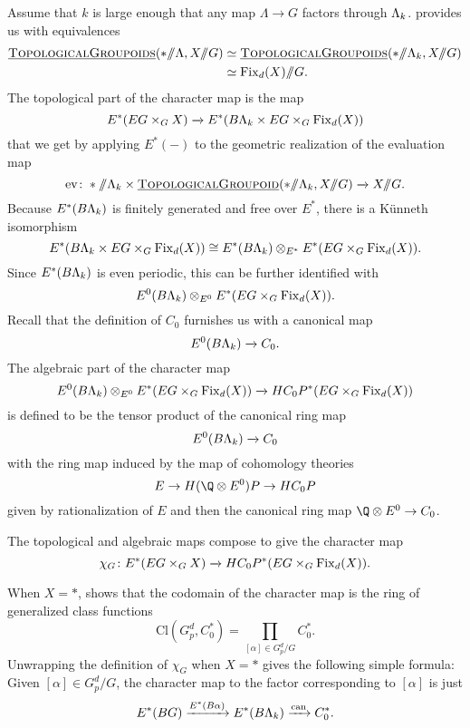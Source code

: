 Assume that $k$ is large enough that any map $\Lambda \rightarrow G$ factors through $\Lambda_k$.   provides us with equivalences
\begin{align*}
\InternalHom{TopologicalGroupoids}(* \mmod \Lambda, X \mmod G) & \simeq \InternalHom{TopologicalGroupoids}(* \mmod \Lk, X \mmod G) \\
& \simeq \Fix_d(X)\mmod G.
\end{align*}
The topological part of the character map is the map
\[
E^*(EG \times_G X) \xrightarrow{} E^*(B\Lambda_k \times EG\times_G \operatorname{Fix}_d(X))
\]
that we get by applying $E^*(-)$ to the geometric realization of the evaluation map
\[
\mathrm{ev} \colon * \mmod \Lk \times \InternalHom{TopologicalGroupoid}(* \mmod \Lk, X \mmod G) \xrightarrow{} X \mmod G.
\]
Because $E^*(B\Lambda_k)$ is finitely generated and free over $E^*$, there is a K\"unneth isomorphism
\[
E^*(B\Lambda_k \times EG\times_G \operatorname{Fix}_d(X)) \cong E^*(B\Lambda_k) \otimes_{E^*} E^*(EG \times_G \operatorname{Fix}_d(X)).
\]
Since $E^*(B\Lambda_k)$ is even periodic, this can be further identified with
\[
E^0(B\Lambda_k) \otimes_{E^0} E^*(EG \times_G \operatorname{Fix}_d(X)).
\]
Recall that the definition of $C_0$ furnishes us with a canonical map
\[
E^0(B\Lambda_k) \xrightarrow{} C_0.
\]
The algebraic part of the character map
\[
E^0(B\Lambda_k) \otimes_{E^0} E^*(EG \times_G \operatorname{Fix}_d(X)) \xrightarrow{} HC_{0}P^{*}(EG \times_G \operatorname{Fix}_d(X)) 
\]
is defined to be the tensor product of the canonical ring map
\[
E^0(B\Lambda_k) \xrightarrow{} C_0
\]
with the ring map induced by the map of cohomology theories
\[
E \rightarrow H(\Q \otimes E^0)P \rightarrow HC_0P
\]
given by rationalization of $E$ and then the canonical ring map $\Q \otimes E^0 \rightarrow C_0$.

The topological and algebraic maps compose to give the character map
\[
\chi_G \colon E^*(EG \times_G X) \xrightarrow{} HC_{0}P^{*}(EG \times_G \operatorname{Fix}_d(X)).
\]


\begin{example} \label{charmapexample}
When $X = \ast$,  shows that the codomain of the character map is the ring of generalized class functions 
\[
\mathrm{Cl}(G_{p}^{d}, C_{0}^{*}) = \prod_{[\alpha] \in G_{p}^{d}/G} C_{0}^*. 
\]
Unwrapping the definition of $\chi_G$ when $X = \ast$ gives the following simple formula: Given $[\alpha] \in G_{p}^{d}/G$, the character map to the factor corresponding to $[\alpha]$ is just
\[
E^*(BG) \xrightarrow{E^*(B\alpha)} E^*(B\Lambda_k) \xrightarrow{\text{can}} C_{0}^{*}.
\]
\end{example}


